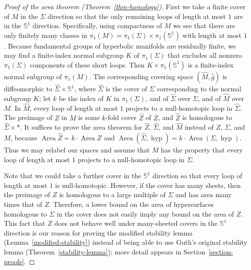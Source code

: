 \documentclass[12pt]{amsart}
\numberwithin{equation}{section}
\begin{document}
\begin{proof}[Proof of the area theorem (Theorem~\ref{thm-homology})]
 First we take a finite cover of $M$ in the $\Sigma$ direction so that the only remaining loops of length at most $1$ are in the $\mathbb{S}^1$ direction.  Specifically, using compactness of $M$ we see that there are only finitely many classes in $\pi_1(M) = \pi_1(\Sigma) \times \pi_1(\mathbb{S}^1)$ with length at most $1$.  Because fundamental groups of hyperbolic manifolds are residually finite, we may find a finite-index normal subgroup $K$ of $\pi_1(\Sigma)$ that excludes all nonzero $\pi_1(\Sigma)$ components of these short loops.  Then $K \times \pi_1(\mathbb{S}^1)$ is a finite-index normal subgroup of $\pi_1(M)$.  The corresponding covering space $(\widehat{M}, \widehat{g})$ is diffeomorphic to $\widehat{\Sigma} \times \mathbb{S}^1$, where $\widehat{\Sigma}$ is the cover of $\Sigma$ corresponding to the normal subgroup $K$; let $k$ be the index of $K$ in $\pi_1(\Sigma)$, and of $\widehat{\Sigma}$ over $\Sigma$, and of $\widehat{M}$ over $M$.  In $\widehat{M}$, every loop of length at most $1$ projects to a null-homotopic loop in $\widehat{\Sigma}$.  The preimage of $Z$ in $\widehat{M}$ is some $k$-fold cover $\widehat{Z}$ of $Z$, and $\widehat{Z}$ is homologous to $\widehat{\Sigma} \times \ast$.  It suffices to prove the area theorem for $\widehat{Z}$, $\widehat{\Sigma}$, and $\widehat{M}$ instead of $Z$, $\Sigma$, and $M$, because $\operatorname{Area} \widehat{Z} = k \cdot \operatorname{Area} Z$ and $\operatorname{Area} (\widehat{\Sigma}, \operatorname{hyp}) = k \cdot \operatorname{Area} (\Sigma, \operatorname{hyp})$.  Thus we may relabel our spaces and assume that $M$ has the property that every loop of length at most $1$ projects to a null-homotopic loop in $\Sigma$.

Note that we could take a further cover in the $\mathbb{S}^1$ direction so that every loop of length at most $1$ is null-homotopic.  However, if the cover has many sheets, then the preimage of $Z$ is homologous to a large multiple of $\Sigma$ and has area many times that of $Z$.  Therefore, a lower bound on the area of hypersurfaces homologous to $\Sigma$ in the cover does not easily imply any bound on the area of $Z$.  This fact that $Z$ does not behave well under many-sheeted covers in the $\mathbb{S}^1$ direction is our reason for proving the modified stability lemma (Lemma~\ref{modified-stability}) instead of being able to use Guth's original stability lemma (Theorem~\ref{stability-lemma}); more detail appears in Section~\ref{section-proofs}.


\end{proof}
\end{document}
